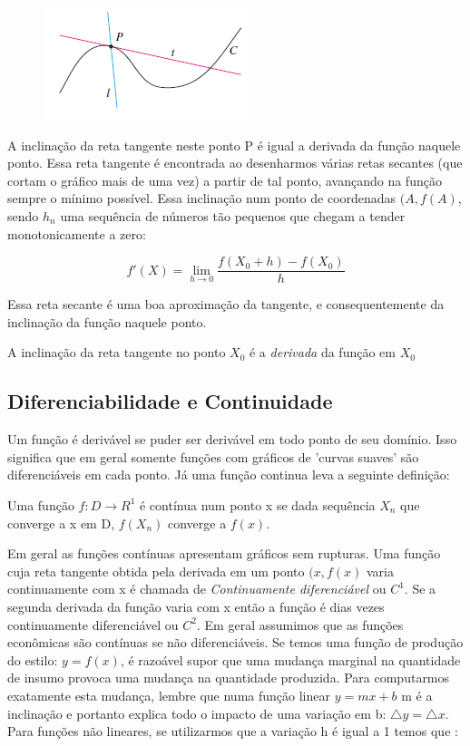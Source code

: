 \documentclass[12pt,a4paper,oneside,brazil]{abntex2}
\begin{document}
\begin{figure}[ht]
\centering
\includegraphics[scale=0.8]{Tangente.png}
\caption{\cite[p. 76]{stewart}}
\end{figure}

A inclinação da reta tangente neste ponto P é igual a derivada da função naquele ponto. Essa reta tangente é encontrada ao desenharmos várias retas secantes (que cortam o gráfico mais de uma vez) a partir de tal ponto, avançando na função sempre o mínimo possível. Essa inclinação num ponto de coordenadas $ (A, f(A) $, sendo $h_n$ uma sequência de números tão pequenos que chegam a tender monotonicamente a zero:

\begin{equation}\label{inclinação tangente}
f'(X) = \lim_{h \rightarrow 0} \frac{f (X_0 + h) - f (X_0)}{h}
\end{equation}

Essa  reta secante é uma boa aproximação da tangente, e consequentemente da inclinação da função naquele ponto.


A inclinação da reta tangente no ponto $X_0$ é a \emph{derivada} da função em $X_0$

\subsection{Diferenciabilidade e Continuidade}
Um função é derivável se puder ser derivável em todo ponto de seu domínio. Isso significa que em geral somente funções com gráficos de 'curvas suaves' são diferenciáveis em cada ponto. Já uma função continua leva a seguinte definição: \newline

Uma função $ f: D \rightarrow R^1$ é contínua num ponto x se dada sequência ${X_n}$ que converge a x em D, $ f (X_n)$ converge a $ f (x)$. \newline

Em geral as funções contínuas apresentam gráficos sem rupturas. Uma função cuja reta tangente obtida pela derivada em um ponto $(x, f (x)$ varia continuamente com x é chamada de \emph{Continuamente diferenciável} ou \textbf{$C^1$}. Se a segunda derivada da função varia com x então a função é dias vezes continuamente diferenciável ou \textbf{$C^2$}. Em geral assumimos que as funções econômicas são contínuas se não diferenciáveis. Se temos uma função de produção do estilo: $y = f (x)$, é razoável supor que uma mudança marginal na quantidade de insumo provoca uma mudança na quantidade produzida. Para computarmos exatamente esta mudança, lembre que numa função linear $ y = m x + b$ m é a inclinação e portanto explica todo o impacto de uma variação em b: $\triangle y = \triangle x$. Para funções não lineares, se utilizarmos que a variação h é igual a 1 temos que :
\end{document}
